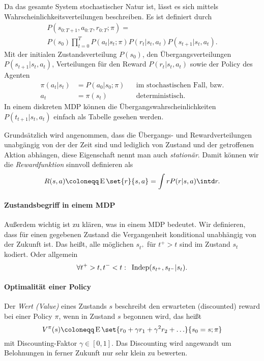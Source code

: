 \noindent Da das gesamte System stochastischer Natur ist, lässt es sich mittels Wahrscheinlichkeitsverteilungen beschreiben. Es ist definiert durch
\begin{gather*}
	P(s_{0:T+1},a_{0:T},r_{0:T}; \pi)=\\P(s_0)\prod_{t=0}^TP(a_t|s_t;\pi)P(r_t|s_t,a_t)P(s_{t+1}|s_t,a_t).
\end{gather*}
Mit der initialen Zustandsverteilung $P(s_0)$, den Übergangsverteilungen $P(s_{t+1}|s_t,a_t)$, Verteilungen für den Reward $P(r_t|s_t,a_t)$ sowie der Policy des Agenten 
\begin{align*}
	\pi(a_t|s_t)&=P(a_0|s_0;\pi) &&\text{im stochastischen Fall, bzw.}\\
	a_t&=\pi(s_t)&&\text{deterministisch.}
\end{align*}%
In einem diskreten MDP können die Übergangswahrscheinlichkeiten $P(t_{t+1}|s_t,a_t)$ einfach als Tabelle gesehen werden.

Grundsätzlich wird angenommen, dass die Übergangs- und Rewardverteilungen unabgängig von der der Zeit sind und lediglich von Zustand und der getroffenen Aktion abhängen, diese Eigenschaft nennt man auch \emph{stationär}. 
Damit können wir die \emph{Rewardfunktion} sinnvoll definieren als
\begin{equation}\label{rewardfunction}
	R(s,a)\coloneqq\E\set{r}{s,a}=\int rP(r|s,a)\intd r.
\end{equation}

\paragraph{Zustandsbegriff in einem MDP}
Außerdem wichtig ist zu klären, was  in einem MDP bedeutet. Wir definieren, dass für einen gegebenen Zustand die Vergangenheit konditional unabhängig von der Zukunft ist. Das heißt, alle möglichen  $s_{t^+}$ für $t^+>t$ sind im Zustand $s_t$ kodiert. Oder allgemein
\begin{equation*}
	\forall t^+>t,t^-<t:\enspace\operatorname{Indep}(s_{t^+},s_{t^-}|s_t).	
\end{equation*} 

\paragraph{Optimalität einer Policy}
Der \emph{Wert (Value)} eines Zustands $s$ beschreibt den erwarteten (discounted) reward bei einer Policy $\pi$, wenn in Zustand $s$ begonnen wird, das heißt
\begin{equation*}
 	V^\pi(s)\coloneqq\E\set{r_0+\gamma r_1+\gamma^2r_2+\ldots}{s_0=s;\pi}
 \end{equation*} 
mit Discounting-Faktor $\gamma\in[0,1]$. Das Discounting wird angewandt um Belohnungen in ferner Zukunft nur sehr klein zu bewerten.

